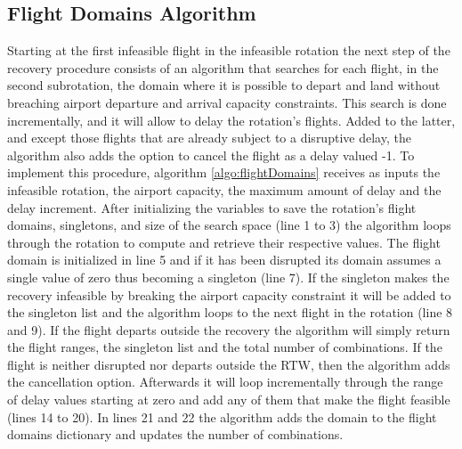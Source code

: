 
\subsection{Flight Domains Algorithm} \label{sec:flightDomains}

Starting at the first infeasible flight in the infeasible rotation the next step of the recovery procedure consists of an algorithm that searches for each flight, in the second subrotation, the domain where it is possible to depart and land without breaching airport departure and arrival capacity constraints. This search is done incrementally, and it will allow to delay the rotation’s flights. Added to the latter, and except those flights that are already subject to a disruptive delay, the algorithm also adds the option to cancel the flight as a delay valued -1. To implement this procedure, algorithm \ref{algo:flightDomains} receives as inputs the infeasible rotation, the airport capacity, the maximum amount of delay and the delay increment. After initializing the variables to save the rotation's flight domains, singletons, and size of the search space (line 1 to 3) the algorithm loops through the rotation to compute and retrieve their respective values. The flight domain is initialized in line 5 and if it has been disrupted its domain assumes a single value of zero thus becoming a singleton (line 7). If the singleton makes the recovery infeasible by breaking the airport capacity constraint it will be added to the singleton list and the algorithm loops to the next flight in the rotation (line 8 and 9). If the flight departs outside the recovery the algorithm will simply return the flight ranges, the singleton list and the total number of combinations. If the flight is neither disrupted nor departs outside the RTW, then the algorithm adds the cancellation option. Afterwards it will loop incrementally through the range of delay values starting at zero and add any of them that make the flight feasible (lines 14 to 20). In lines 21 and 22 the algorithm adds the domain to the flight domains dictionary and updates the number of combinations. \\


